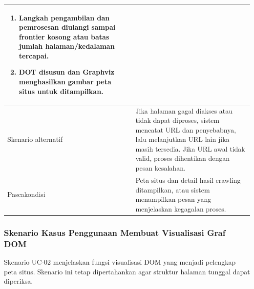 \begin{longtable}{|p{}|p{}|}
\begin{enumerate}[leftmargin=*, itemsep=0pt, topsep=0pt]
        \item Langkah pengambilan dan pemrosesan diulangi sampai frontier kosong atau batas jumlah halaman/kedalaman tercapai.
        \item DOT disusun dan Graphviz menghasilkan gambar peta situs untuk ditampilkan.
    \end{enumerate} \\ \hline
    Skenario alternatif & Jika halaman gagal diakses atau tidak dapat diproses, sistem mencatat URL dan penyebabnya, lalu melanjutkan URL lain jika masih tersedia. Jika URL awal tidak valid, proses dihentikan dengan pesan kesalahan. \\ \hline
    Pascakondisi & Peta situs dan detail hasil crawling ditampilkan, atau sistem menampilkan pesan yang menjelaskan kegagalan proses. \\ \hline
\end{longtable}

\subsubsection{Skenario Kasus Penggunaan Membuat Visualisasi Graf DOM}
Skenario UC-02 menjelaskan fungsi visualisasi DOM yang menjadi pelengkap peta situs. Skenario ini tetap dipertahankan agar struktur halaman tunggal dapat diperiksa.

